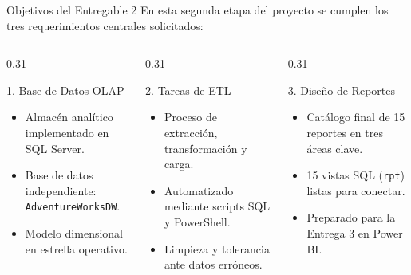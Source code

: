 \documentclass[aspectratio=169, 10pt]{beamer}
\begin{document}
\begin{frame}{Objetivos del Entregable 2}
    En esta segunda etapa del proyecto se cumplen los tres requerimientos centrales solicitados:
    
    \vspace{0.3cm}
    \begin{columns}[t]
        \begin{column}{0.31\textwidth}
            \begin{block}{1. Base de Datos OLAP}
                \small
                \begin{itemize}
                    \item Almacén analítico implementado en SQL Server.
                    \item Base de datos independiente: \texttt{AdventureWorksDW}.
                    \item Modelo dimensional en estrella operativo.
                \end{itemize}
            \end{block}
        \end{column}
        
        \begin{column}{0.31\textwidth}
            \begin{block}{2. Tareas de ETL}
                \small
                \begin{itemize}
                    \item Proceso de extracción, transformación y carga.
                    \item Automatizado mediante scripts SQL y PowerShell.
                    \item Limpieza y tolerancia ante datos erróneos.
                \end{itemize}
            \end{block}
        \end{column}
        
        \begin{column}{0.31\textwidth}
            \begin{block}{3. Diseño de Reportes}
                \small
                \begin{itemize}
                    \item Catálogo final de 15 reportes en tres áreas clave.
                    \item 15 vistas SQL (\texttt{rpt}) listas para conectar.
                    \item Preparado para la Entrega 3 en Power BI.
                \end{itemize}
            \end{block}
        \end{column}
    \end{columns}
\end{frame}
\end{document}
